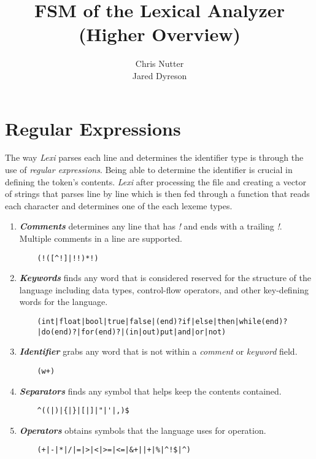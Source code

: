 \documentclass{article}
\title{FSM of the Lexical Analyzer (Higher Overview)}
\author{Chris Nutter \\
        Jared Dyreson}
\begin{document}
\maketitle
\tableofcontents

\newpage

\section{Regular Expressions}
    The way \emph{Lexi} parses each line and determines the identifier type is through the use of \emph{regular expressions}. Being able to determine the identifier is crucial in defining the token's contents. \emph{Lexi} after processing the file and creating a vector of strings that parses line by line which is then fed through a function that reads each character and determines one of the each lexeme types.

    \begin{enumerate}
        \item \emph{\textbf{Comments}} determines any line that has \emph{!} and ends with a trailing \emph{!}. Multiple comments in a line are supported.
        \begin{Verbatim}
    (!([^!]|!!)*!)
        \end{Verbatim}
        
        \item \emph{\textbf{Keywords}} finds any word that is considered reserved for the structure of the language including data types, control-flow operators, and other key-defining words for the language.  
        \begin{Verbatim}
    (int|float|bool|true|false|(end)?if|else|then|while(end)?
    |do(end)?|for(end)?|(in|out)put|and|or|not)
        \end{Verbatim}
        
        \item \emph{\textbf{Identifier}} grabs any word that is not within a \emph{comment} or \emph{keyword} field.
        \begin{Verbatim}
    (w+)
        \end{Verbatim}
        
        \item \emph{\textbf{Separators}} finds any symbol that helps keep the contents contained.
        \begin{Verbatim}
    ^((|)|{|}|[|]|"|'|,)$
        \end{Verbatim}
        
        \item \emph{\textbf{Operators}} obtains symbols that the language uses for operation.
        \begin{Verbatim}
    (+|-|*|/|=|>|<|>=|<=|&+||+|%|^!$|^)
        \end{Verbatim}
        
    \end{enumerate}
\end{document}
